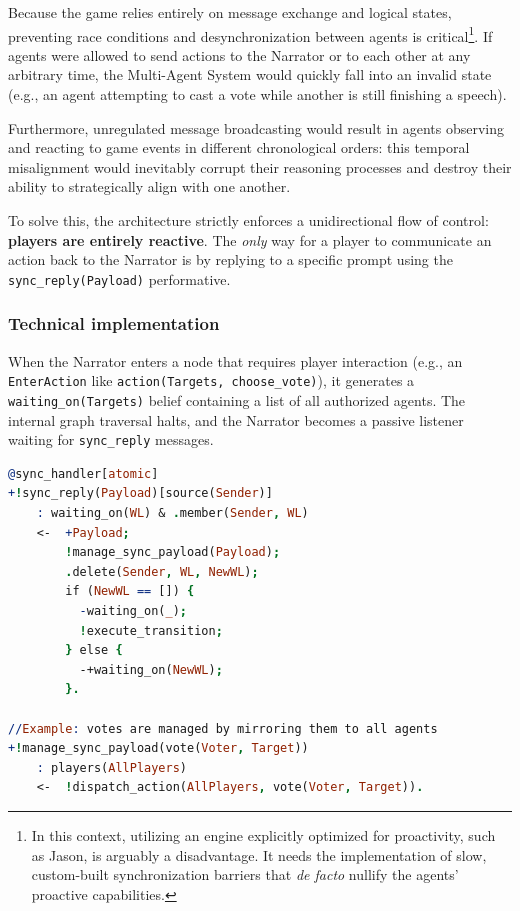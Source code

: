 Because the game relies entirely on message exchange and logical states, preventing race conditions and desynchronization between agents is critical\footnote{In this context, utilizing an engine explicitly optimized for proactivity, such as Jason, is arguably a disadvantage. It needs the implementation of slow, custom-built synchronization barriers that \emph{de facto} nullify the agents' proactive capabilities.}. If agents were allowed to send actions to the Narrator or to each other at any arbitrary time, the Multi-Agent System would quickly fall into an invalid state (e.g., an agent attempting to cast a vote while another is still finishing a speech). 

Furthermore, unregulated message broadcasting would result in agents observing and reacting to game events in different chronological orders: this temporal misalignment would inevitably corrupt their reasoning processes and destroy their ability to strategically align with one another.

To solve this, the architecture strictly enforces a unidirectional flow of control: \textbf{players are entirely reactive}. The \emph{only} way for a player to communicate an action back to the Narrator is by replying to a specific prompt using the \texttt{sync\_reply(Payload)} performative. 

\subsubsection{Technical implementation}
When the Narrator enters a node that requires player interaction (e.g., an \texttt{EnterAction} like \texttt{action(Targets, choose\_vote)}), it generates a \texttt{waiting\_on(Targets)} belief containing a list of all authorized agents. The internal graph traversal halts, and the Narrator becomes a passive listener waiting for \texttt{sync\_reply} messages.

\vspace{1em}
\begin{lstlisting}[frame=single, language=Prolog, caption={The Synchronization and Payload Management mechanics from the narrator; it is passively waiting for external messages from the players.}, label={lst:sync_logic}]
@sync_handler[atomic]
+!sync_reply(Payload)[source(Sender)]
    : waiting_on(WL) & .member(Sender, WL) 
    <-  +Payload;
        !manage_sync_payload(Payload);
        .delete(Sender, WL, NewWL);
        if (NewWL == []) {
          -waiting_on(_);
          !execute_transition;
        } else {
          -+waiting_on(NewWL);
        }.

//Example: votes are managed by mirroring them to all agents
+!manage_sync_payload(vote(Voter, Target)) 
    : players(AllPlayers)
    <-  !dispatch_action(AllPlayers, vote(Voter, Target)).
\end{lstlisting}

